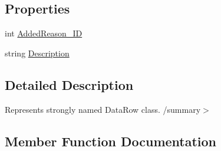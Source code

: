 \subsection*{Properties}
\begin{DoxyCompactItemize}
\item 
int \hyperlink{class_env_int_1_1_win32_1_1_field_tech_1_1_manager_1_1_data_sets_1_1_guide_ware_mobile_data_set_1_1_added_reason_row_a0670fef7b16bd62c4317cc8e0d065049}{Added\+Reason\+\_\+\+I\+D}
\item 
string \hyperlink{class_env_int_1_1_win32_1_1_field_tech_1_1_manager_1_1_data_sets_1_1_guide_ware_mobile_data_set_1_1_added_reason_row_a2d850dea5ea34e51ae246da92ec5e384}{Description}
\end{DoxyCompactItemize}


\subsection{Detailed Description}
Represents strongly named Data\+Row class. /summary$>$ 

\subsection{Member Function Documentation}
\hypertarget{class_env_int_1_1_win32_1_1_field_tech_1_1_manager_1_1_data_sets_1_1_guide_ware_mobile_data_set_1_1_added_reason_row_a602a497dba05965e94bac14f372b5bb5}{}
